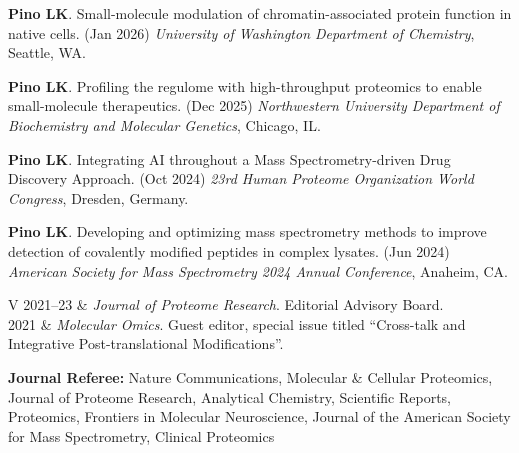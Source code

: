 \documentclass[11pt]{article}
\begin{document}
\begin{etaremune}

    \item \textbf{Pino LK}. Small-molecule modulation of chromatin-associated protein function in native cells. (Jan 2026) \textit{University of Washington Department of Chemistry}, Seattle, WA.

    \item \textbf{Pino LK}. Profiling the regulome with high-throughput proteomics to enable small-molecule therapeutics. (Dec 2025) \textit{Northwestern University Department of Biochemistry and Molecular Genetics}, Chicago, IL.

    \item \textbf{Pino LK}. Integrating AI throughout a Mass Spectrometry-driven Drug Discovery Approach. (Oct 2024) \textit{23rd Human Proteome Organization World Congress}, Dresden, Germany.

    \item \textbf{Pino LK}. Developing and optimizing mass spectrometry methods to improve detection of covalently modified peptides in complex lysates. (Jun 2024) \textit{American Society for Mass Spectrometry 2024 Annual Conference}, Anaheim, CA.


    
\end{etaremune}


{}

\begin{tabular}{V}
  2021--23 & \textit{Journal of Proteome Research}. Editorial Advisory Board. \\
  2021 & \textit{Molecular Omics}. Guest editor, special issue titled ``Cross-talk and Integrative Post-translational Modifications''. \\
\end{tabular}

{\bf Journal Referee: }{Nature Communications, Molecular \& Cellular Proteomics, Journal of Proteome Research, Analytical Chemistry, Scientific Reports, Proteomics, Frontiers in Molecular Neuroscience, Journal of the American Society for Mass Spectrometry, Clinical Proteomics}\\ 


\end{document}
